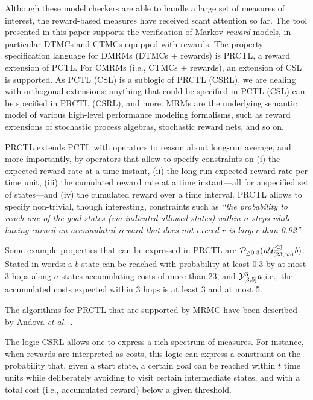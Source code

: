 \documentclass[times, 10pt,twocolumn]{article}
\newcommand{\Y}[2]{{\cal Y}^{#1}_{#2}}
\newcommand{\Prob}[3]{{\cal P}_{#1 #2}(#3)}
\begin{document}
Although these model checkers are able to handle a large set of measures
of interest, the reward-based measures have received scant attention so 
far.
The tool presented in this paper supports the verification of Markov
\emph{reward} models, in particular DTMCs and CTMCs equipped with rewards.
The property-specification language for DMRMs (DTMCs + rewards) is PRCTL,
a reward extension of PCTL.
For CMRMs (i.e., CTMCs + rewards), an extension of CSL is supported.
As PCTL (CSL) is a sublogic of PRCTL (CSRL), we are dealing with orthogonal
extensions: anything that could be specified in PCTL (CSL) can be specified 
in PRCTL (CSRL), and more.
MRMs are the underlying semantic model of various high-level performance 
modeling formalisms, such as reward extensions of stochastic process
algebras, stochastic reward nets, and so on.


PRCTL extends PCTL with operators to reason about long-run average, and 
more importantly, by operators that allow to specify constraints on (i) 
the expected reward rate at a time instant, (ii) the long-run expected 
reward rate per time unit, (iii) the cumulated reward rate at a time 
instant---all for a specified set of states---and (iv) the cumulated reward
over a time interval.  
PRCTL allows to specify non-trivial, though interesting, constraints such 
as \emph{``the probability to reach one of the goal states (via indicated 
allowed states) within $n$ steps while having earned an accumulated reward
that does not exceed $r$ is larger than 0.92''}. 

Some example properties that can be expressed in PRCTL are
$\Prob{\geq}{0.3}{{\it a}{\cal U}^{\leq 3}_{(23, \infty )} {\it b}}$.
Stated in words: a {$b$-state} can be reached with probability at least
$0.3$ by at most 3 hops along $a$-states accumulating costs of more than 
23, and $\Y{3}{[3,5]}{\it a}$,i.e., the accumulated costs expected within 
3 hops is at least 3 and at most 5.

The algorithms for PRCTL that are supported by MRMC have been described by Andova
\emph{et al.}~\cite{AndovaHK_FORMATS03}.

The logic CSRL allows one to express a rich spectrum of measures. For
instance, when rewards are interpreted as costs, this logic can
express a constraint on the probability that, given a start state, a
certain goal can be reached within $t$ time units while deliberately
avoiding to visit certain intermediate states, and with a total cost
(i.e., accumulated reward) below a given threshold. 
\end{document}
